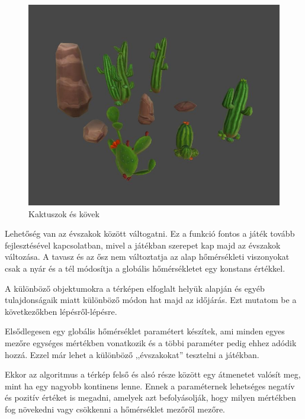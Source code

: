 
\begin{figure}[h!]
\centering
\includegraphics[scale=0.4]{kepek/Cactus.JPG}
\caption[Kaktuszok és kövek]{Kaktuszok és kövek \footnotemark} 
\label{fig:Cactus}
\end{figure}


\newpage
{}

Lehetőség van az évszakok között váltogatni. Ez a funkció fontos a játék tovább fejlesztésével kapcsolatban, mivel a játékban szerepet kap majd az évszakok változása. A tavasz és az ősz nem változtatja az alap hőmérsékleti viszonyokat csak a nyár és a tél módosítja a globális hőmérsékletet egy konstans értékkel. 

A különböző objektumokra a térképen elfoglalt helyük alapján és egyéb tulajdonságaik miatt különböző módon hat majd az időjárás. Ezt mutatom be a következőkben lépésről-lépésre.

Elsődlegesen egy globális hőmérséklet paramétert készítek, ami minden egyes mezőre egységes mértékben vonatkozik és a többi paraméter pedig ehhez adódik hozzá. Ezzel már lehet a különböző ,,évszakokat'' tesztelni a játékban.

Ekkor az algoritmus a térkép felső és alsó része között egy átmenetet valósít meg, mint ha egy nagyobb kontinens lenne. Ennek a paraméternek lehetséges negatív és pozitív értéket is megadni, amelyek azt befolyásolják, hogy milyen mértékben fog növekedni vagy csökkenni a hőmérséklet mezőről mezőre.

